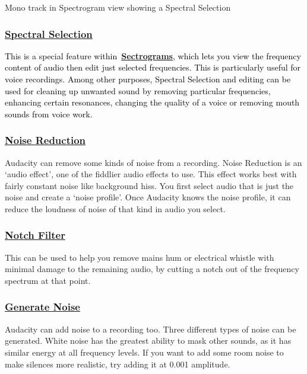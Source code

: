 \documentclass[letterpaper]{article}
\begin{document}
Mono track in Spectrogram view showing a Spectral Selection

\subsubsection[Spectral
Selection]{\href{https://manual.audacityteam.org/man/spectral_selection.html}{\textcolor[rgb]{0.3529412,0.21176471,0.5882353}{Spectral
Selection}}}
\textcolor{black}{This is a special feature
within~}\href{https://manual.audacityteam.org/man/spectrogram_view.html}{\textbf{\textcolor[rgb]{0.3529412,0.21176471,0.5882353}{Sectrograms}}}\textcolor{black}{,
which lets you view the frequency content of audio then edit just selected frequencies. This is particularly useful for
voice recordings. Among other purposes, Spectral Selection and editing can be used for cleaning up unwanted sound by
removing particular frequencies, enhancing certain resonances, changing the quality of a voice or removing mouth sounds
from voice work.}

\subsubsection[Noise
Reduction]{\href{https://manual.audacityteam.org/man/noise_reduction.html}{\textcolor[rgb]{0.3529412,0.21176471,0.5882353}{Noise
Reduction}}}
{\color{black}
Audacity can remove some kinds of noise from a recording. Noise Reduction is an `audio effect', one of the fiddlier
audio effects to use. This effect works best with fairly constant noise like background hiss. You first select audio
that is just the noise and create a `noise profile'. Once Audacity knows the noise profile, it can reduce the loudness
of noise of that kind in audio you select.}

\subsubsection[Notch
Filter]{\href{https://manual.audacityteam.org/man/notch_filter.html}{\textcolor[rgb]{0.3529412,0.21176471,0.5882353}{Notch
Filter}}}
{\color{black}
This can be used to help you remove mains hum or electrical whistle with minimal damage to the remaining audio, by
cutting a {\textquotedbl}notch{\textquotedbl} out of the frequency spectrum at that point.}

\subsubsection[Generate
Noise]{\href{https://manual.audacityteam.org/man/generate_menu.html\#noise}{\textcolor[rgb]{0.3529412,0.21176471,0.5882353}{Generate
Noise}}}
{\color{black}
Audacity can add noise to a recording too. Three different types of noise can be generated. White noise has the greatest
ability to mask other sounds, as it has similar energy at all frequency levels. If you want to add some room noise to
make silences more realistic, try adding it at 0.001 amplitude.}
\end{document}
